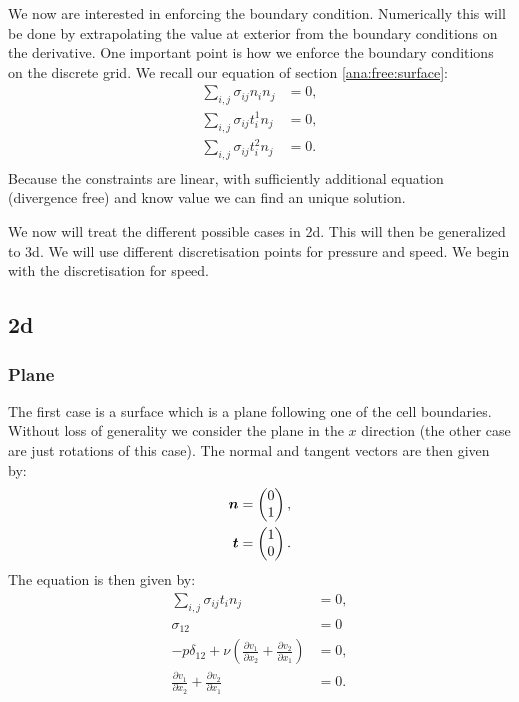 We now are interested in enforcing the boundary condition.
Numerically this will be done by extrapolating the value at exterior from the boundary conditions on the derivative.
One important point is how we enforce the boundary conditions on the discrete grid.
We recall our equation of section \ref{ana:free:surface}:
\begin{align}
	\sum_{i,j}\sigma_{ij}n_{i}n_{j}&=0,\\
	\sum_{i,j}\sigma_{ij}t^{1}_{i}n_{j}&=0,\\
	\sum_{i,j}\sigma_{ij}t^{2}_{i}n_{j}&=0.\\
\end{align}
Because the constraints are linear, with sufficiently additional equation (divergence free) and know value we can find an unique solution.

We now will treat the different possible cases in 2d. This will then be generalized to 3d.
We will use different discretisation points for pressure and speed.
We begin with the discretisation for speed.

\subsection{2d}
\label{topo:extrap:2d}
\subsubsection{Plane}

The first case is a surface which is a plane following one of the cell boundaries.
Without loss of generality we consider the plane in the $x$ direction (the other case are just rotations of this case).
The normal and tangent vectors are then given by:
\begin{align}
	{\boldsymbol {n}}&=\begin{pmatrix}
			0\\
			1
		\end{pmatrix},\\
	{\boldsymbol {t}}&=\begin{pmatrix}
			1\\
			0
		\end{pmatrix}.
\end{align}
The equation is then given by:
\begin{align}
	\sum_{i,j}\sigma_{ij}t_{i}n_{j}&=0,\\
	\sigma_{12}&=0\\
	-p \delta_{12}+\nu\left(\frac{\partial v_{1}}{\partial x_{2}}+\frac{\partial v_{2}}{\partial x_{1}}\right)&=0,\\
	\frac{\partial v_{1}}{\partial x_{2}}+\frac{\partial v_{2}}{\partial x_{1}}&=0.\\
\end{align}

